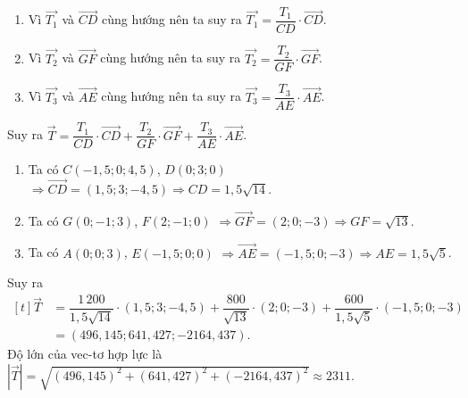 \begin{ex}
{		\begin{enumerate}[+)]
			\item Vì $\overrightarrow{T_1}$ và $\overrightarrow{CD}$ cùng hướng nên ta suy ra $\overrightarrow{T_1}=\dfrac{T_1}{CD}\cdot\overrightarrow{CD}$.
			\item Vì $\overrightarrow{T_2}$ và $\overrightarrow{GF}$ cùng hướng nên ta suy ra $\overrightarrow{T_2}=\dfrac{T_2}{GF}\cdot\overrightarrow{GF}$.
			\item Vì $\overrightarrow{T_3}$ và $\overrightarrow{AE}$ cùng hướng nên ta suy ra $\overrightarrow{T_3}=\dfrac{T_3}{AE}\cdot\overrightarrow{AE}$.
		\end{enumerate}
		Suy ra $\overrightarrow{T} =\dfrac{T_1}{CD}\cdot\overrightarrow{CD} +\dfrac{T_2}{GF}\cdot\overrightarrow{GF} +\dfrac{T_3}{AE}\cdot\overrightarrow{AE}$.
		\begin{enumerate}[+)]
			\item Ta có $C(-1{,}5;0;4{,}5)$, $D(0;3;0)$ $\Rightarrow \overrightarrow{CD}=(1{,}5;3;-4{,}5) \Rightarrow CD=1{,}5\sqrt{14}$.
			\item Ta có $G(0;-1;3)$, $F(2;-1;0)$ $\Rightarrow \overrightarrow{GF}=(2;0;-3) \Rightarrow GF=\sqrt{13}$.
			\item Ta có $A(0;0;3)$, $E(-1{,}5;0;0)$ $\Rightarrow \overrightarrow{AE}=(-1{,}5;0;-3) \Rightarrow AE=1{,}5\sqrt{5}$.
		\end{enumerate}
		Suy ra 
		$\begin{aligned}[t]
			\overrightarrow{T} &=\dfrac{1\,200}{1{,}5\sqrt{14}}\cdot(1{,}5;3;-4{,}5) +\dfrac{800}{\sqrt{13}}\cdot(2;0;-3) +\dfrac{600}{1{,}5\sqrt{5}}\cdot(-1{,}5;0;-3) \\
			&=(496{,}145;641{,}427;-2164{,}437).
		\end{aligned}$\\
		Độ lớn của vec-tơ hợp lực là $|\overrightarrow{T}| =\sqrt{(496{,}145)^2+(641{,}427)^2+(-2164{,}437)^2} \approx 2311$.
	}
\end{ex}

